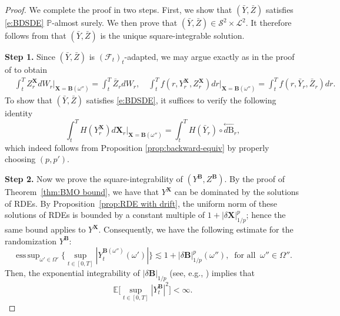 \documentclass[11pt,reqno]{amsart}
\DeclareMathOperator*{\esssup}{ess\,sup}
\newcommand{\BX}{{\mathbf{X}}}
\newcommand{\BB}{{\mathbf{B}}}
\newcommand{\MF}{{\mathcal{F}}}
\numberwithin{equation}{section}
\def\PP{{\mathbb P}}
\def\E{\mathbb E}
\begin{document}
\begin{proof}
We complete the proof in two steps. First, we show that $(\bar Y,\bar Z)$ satisfies \eqref{e:BDSDE} $\PP$-almost surely. We then prove that $(\bar Y,\bar Z)\in\mathcal S^2\times\mathcal L^2$. It therefore follows from \cite[Theorem~1.1]{PardouxPeng1994BDSDE} that $(\bar Y,\bar Z)$ is the unique square-integrable solution.


{\bf Step 1.} Since $(\bar Y,\bar Z)$ is $(\MF_t)_t$-adapted, we may argue exactly as in the proof of \cite[Proposition~8.2]{FLZ26} to obtain
\begin{align*}
&\int_{t}^{T} Z^{\mathbf X}_r  dW_r \Big|_{\BX=\BB(\omega'')} = \int_{t}^{T} \bar Z_r dW_r, \quad \int_{t}^{T} f(r,Y^{\mathbf X}_r ,Z^{\mathbf X}_r ) dr\Big|_{\BX=\BB(\omega'')} = \int_{t}^{T} f(r, \bar Y_r, \bar Z _r) dr . 
\end{align*}
To show that $(\bar Y, \bar Z)$ satisfies \eqref{e:BDSDE}, it suffices to verify the following  identity
$$
\int_{t}^{T}H(Y^{\mathbf X}_r) d\mathbf X_{r} \Big|_{\BX=\BB(\omega'')} = \int_{t}^{T}H( \bar Y_r) \circ \overset{\leftarrow}{d \mathrm B}_r,
$$ 
which indeed follows from Proposition \ref{prop:backward-equiv} by properly choosing $(p,p')$.

{\bf Step 2.} Now we prove the square-integrability of $(Y^{\mathbf B},Z^{\mathbf B})$. By the proof of Theorem~\ref{thm:BMO bound}, we have that $Y^{\mathbf X}$ can be dominated by the solutions of RDEs. By Proposition~\ref{prop:RDE with drift}, the uniform norm of these solutions of RDEs is bounded by a constant multiple of $1 + |\delta \mathbf X|^p_{1/p}$; hence the same bound applies to $Y^{\mathbf X}$. Consequently, we have the following estimate for the randomization $Y^{\mathbf B}$: 
\begin{equation*}
\esssup_{\omega' \in \Omega'} \Big\{ \sup_{t \in [0,T]}|Y^{\mathbf B(\omega'')}_t(\omega')|\Big\} \lesssim 1 + |\delta \mathbf B|^p_{1/p}(\omega''),\ \text{ for all }\ \omega'' \in \Omega''. 
\end{equation*}
Then, the exponential integrability of $|\delta \mathbf B|_{1/p}$ (see, e.g., \cite[Corollary~13.14]{friz2010multidimensional}) implies that 
\begin{equation*}
\E \Big[\sup_{t \in [0,T]} |Y^{\mathbf B}_t|^2 \Big] < \infty.
\end{equation*}


\end{proof}
\end{document}
